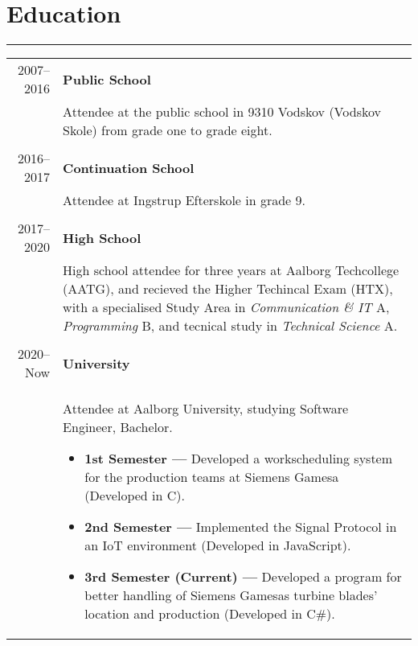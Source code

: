 \documentclass{article}
\begin{document}
\section*{Education}
\hrule width5cm
\begin{longtabu} to \textwidth {r|X}
2007--2016 & \textbf{Public School}\\
&   Attendee at the public school in 9310 Vodskov (Vodskov Skole) from grade one to grade eight.
    \\\\
2016--2017 & \textbf{Continuation School}\\
&   Attendee at Ingstrup Efterskole in grade 9.
    \\\\
2017--2020 & \textbf{High School}\\
&   High school attendee for three years at Aalborg Techcollege (AATG), and recieved the Higher
        Techincal Exam (HTX), with a specialised Study Area in \textit{Communication \& IT} A,
        \textit{Programming} B, and tecnical study in \textit{Technical Science} A. \\\\
2020--Now & \textbf{University}\\
&   Attendee at Aalborg University, studying Software Engineer, Bachelor.
    \begin{itemize}
        \item[] \textbf{1st Semester --- } Developed a workscheduling system for the production
            teams at Siemens Gamesa (Developed in C).
        \item[] \textbf{2nd Semester --- } Implemented the Signal Protocol in an IoT environment
            (Developed in JavaScript).
        \item[] \textbf{3rd Semester (Current) --- } Developed a program for better handling of
            Siemens Gamesas turbine blades' location and production (Developed in C\#).
    \end{itemize}
\end{longtabu}
 
\end{document}
